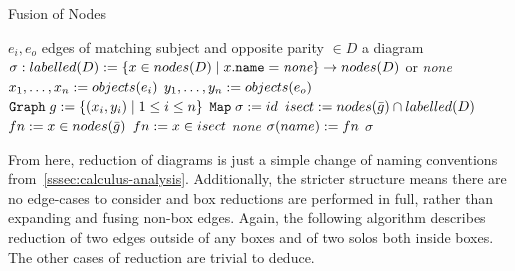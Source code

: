         \begin{breakablealgorithm}
            \caption{Fusion of Nodes}
            \begin{algorithmic}[1]
                \Require$e_i, e_o$ edges of matching subject and opposite parity $\in D$ a diagram
                \Ensure$\sigma : labelled(D) := \{x \in nodes(D) \; | \; x.\texttt{name} = \textit{none}\} \rightarrow nodes(D)$ or \textit{none}
                    \State$x_1, \ldots, x_n := objects(e_i)$
                    \State$y_1, \ldots, y_n := objects(e_o)$
                    \State$\texttt{Graph} \; g := \{(x_i, y_i) \; | \; 1 \leq i \leq n\}$
                    \State$\texttt{Map} \; \sigma := id$
                        \State$isect := nodes(\bar{g}) \cap labelled(D)$
                            \State$fn := x \in nodes(\bar{g})$
                            \State$fn := x \in isect$
                        \Else
                            \State\Return\textit{none}
                        \EndIf
                            \State$\sigma(name) := fn$
                        \EndFor
                    \EndFor
                    \State\Return$\sigma$
                \EndFunction
            \end{algorithmic}
        \end{breakablealgorithm}

        From here, reduction of diagrams is just a simple change of naming conventions from~\ref{sssec:calculus-analysis}.
        Additionally, the stricter structure means there are no edge-cases to consider and box reductions are performed in full, rather than expanding and fusing non-box edges.
        Again, the following algorithm describes reduction of two edges outside of any boxes and of two solos both inside boxes.
        The other cases of reduction are trivial to deduce.

